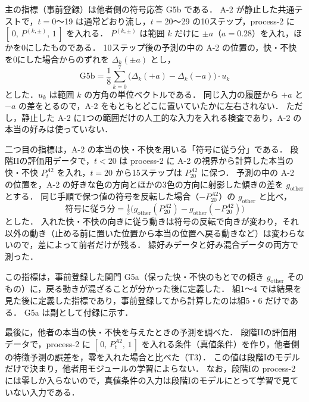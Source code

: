 主の指標（事前登録）は他者側の符号応答 G5b である．
A-2 が静止した共通テストで，$t=0$〜19 は通常どおり流し，$t=20$〜29 の10ステップ，process-2 に $[\,0,\,P^{(k,\pm)},\,1\,]$ を入れる．
$P^{(k,\pm)}$ は範囲 $k$ だけに $\pm a$（$a=0.28$）を入れ，ほかを0にしたものである．
10ステップ後の予測の中の A-2 の位置の，快・不快を0にした場合からのずれを $\Delta_k(\pm a)$ とし，
\begin{equation}
  \mathrm{G5b} = \frac{1}{8}\sum_{k=0}^{7} \bigl(\Delta_k(+a) - \Delta_k(-a)\bigr)\cdot u_k
\end{equation}
とした．$u_k$ は範囲 $k$ の方角の単位ベクトルである．
同じ入力の履歴から $+a$ と $-a$ の差をとるので，A-2 をもともとどこに置いていたかに左右されない．
ただし，静止した A-2 に1つの範囲だけの人工的な入力を入れる検査であり，A-2 の本当の好みは使っていない．

二つ目の指標は，A-2 の本当の快・不快を用いる「符号に従う分」である．
段階IIの評価用データで，$t<20$ は process-2 に A-2 の視界から計算した本当の快・不快 $P^{A2}_t$ を入れ，$t=20$ から15ステップは $P^{A2}_{20}$ に保つ．
予測の中の A-2 の位置を，A-2 の好きな色の方向とほかの3色の方向に射影した傾きの差を $g_{\mathrm{other}}$ とする．
同じ手順で保つ値の符号を反転した場合（$-P^{A2}_{20}$）の $g_{\mathrm{other}}$ と比べ，
\begin{equation}
  \text{符号に従う分} = \tfrac{1}{2}\bigl(g_{\mathrm{other}}(P^{A2}_{20}) - g_{\mathrm{other}}(-P^{A2}_{20})\bigr)
\end{equation}
とした．
入れた快・不快の向きに従う動きは符号の反転で向きが変わり，それ以外の動き（止める前に置いた位置から本当の位置へ戻る動きなど）は変わらないので，差によって前者だけが残る．
緑好みデータと好み混合データの両方で測った．

この指標は，事前登録した関門 G5a（保った快・不快のもとでの傾き $g_{\mathrm{other}}$ そのもの）に，戻る動きが混ざることが分かった後に定義した．
組1〜4 では結果を見た後に定義した指標であり，事前登録してから計算したのは組5・6 だけである．
G5a は副として付録に示す．

最後に，他者の本当の快・不快を与えたときの予測を調べた．
段階IIの評価用データで，process-2 に $[\,0,\,P^{A2}_t,\,1\,]$ を入れる条件（真値条件）を作り，他者側の特徴予測の誤差を，零を入れた場合と比べた（T3）．
この値は段階Iのモデルだけで決まり，他者用モジュールの学習によらない．
なお，段階Iの process-2 には零しか入らないので，真値条件の入力は段階Iのモデルにとって学習で見ていない入力である．

